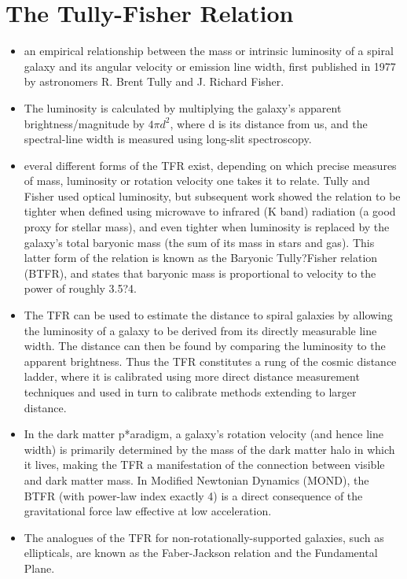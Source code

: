 \section{The Tully-Fisher Relation}
\begin{itemize}[noitemsep]
	\item an empirical relationship between the mass or intrinsic luminosity of a spiral galaxy and its angular velocity or emission line width,  first published in 1977 by astronomers R. Brent Tully and J. Richard Fisher.
	\item  The luminosity is calculated by multiplying the galaxy's apparent brightness/magnitude by $4\pi d^2$, where d is its distance from us, and the spectral-line width is measured using long-slit spectroscopy.
	\item everal different forms of the TFR exist, depending on which precise measures of mass, luminosity or rotation velocity one takes it to relate. Tully and Fisher used optical luminosity, but subsequent work showed the relation to be tighter when defined using microwave to infrared (K band) radiation (a good proxy for stellar mass), and even tighter when luminosity is replaced by the galaxy's total baryonic mass (the sum of its mass in stars and gas). This latter form of the relation is known as the Baryonic Tully?Fisher relation (BTFR), and states that baryonic mass is proportional to velocity to the power of roughly 3.5?4.
	\item The TFR can be used to estimate the distance to spiral galaxies by allowing the luminosity of a galaxy to be derived from its directly measurable line width. The distance can then be found by comparing the luminosity to the apparent brightness. Thus the TFR constitutes a rung of the cosmic distance ladder, where it is calibrated using more direct distance measurement techniques and used in turn to calibrate methods extending to larger distance.
	\item In the dark matter p*aradigm, a galaxy's rotation velocity (and hence line width) is primarily determined by the mass of the dark matter halo in which it lives, making the TFR a manifestation of the connection between visible and dark matter mass. In Modified Newtonian Dynamics (MOND), the BTFR (with power-law index exactly 4) is a direct consequence of the gravitational force law effective at low acceleration.
	\item The analogues of the TFR for non-rotationally-supported galaxies, such as ellipticals, are known as the Faber-Jackson relation and the Fundamental Plane.
\end{itemize}

